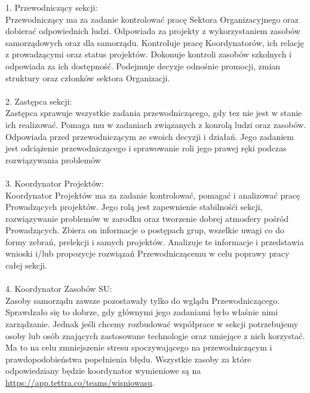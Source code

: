 \documentclass[9pt,a4paper]{report}
\begin{document}
1. Przewodniczący sekcji:\\
Przewodniczący ma za zadanie kontrolować pracę Sektora Organizacyjnego oraz dobierać odpowiednich ludzi. Odpowiada za projekty z wykorzystaniem zasobów samorządowych oraz dla samorządu. Kontroluje pracę Koordynatorów, ich relację z prowadzącymi oraz status projektów. Dokonuje kontroli zasobów szkolnych i odpowiada za ich dostępność. Podejmuje decyzje odnośnie promocji, zmian struktury oraz członków sektora Organizacji.\\\\

2. Zastępca sekcji:\\
Zastępca sprawuje wszystkie zadania przewodniczącego, gdy tez nie jest w stanie ich realizować. Pomaga mu w zadaniach związanych z konrolą ludzi oraz zasobów. Odpowiada przed przewodniczącym ze swoich decyzji i działań. Jego zadaniem jest odciążenie przewodniczącego i sprawowanie roli jego prawej ręki podczas rozwiązywania problemów\\\\

3. Koordynator Projektów:\\
Koordynator Projektów ma za zadanie kontrolować, pomagać i analizować pracę Prowadzących projektów. Jego rolą jest zapewnienie stabilnośći sekcji, rozwiązywanie problemów w zarodku oraz tworzenie dobrej atmosfery pośród Prowadzących. Zbiera on informacje o postępach grup, wszelkie uwagi co do formy zebrań, prelekcji i samych projektów. Analizuje te informacje i przedstawia wnioski i/lub propozycje rozwiązań Przewodniczącemu w celu poprawy pracy całej sekcji.\\\\

4. Koordynator Zasobów SU:\\ 
Zasoby samorządu zawsze pozostawały tylko do wglądu Przewodniczącego. Sprawdzało się to dobrze, gdy głównymi jego zadaniami było właśnie nimi zarządzanie. Jednak jeśli chcemy rozbudować współprace w sekcji potrzebujemy osoby lub osób znających zastosowane technologie oraz umiejące z nich korzystać. Ma to na celu zmniejszenie stresu spoczywającego na przewodniczącym i prawdopodobieństwa popełnienia błędu. Wszystkie zasoby za które odpowiedziany będzie koordynator wymieniowe są na \url{https://app.tettra.co/teams/wisniowasu}.\\\\
\end{document}
